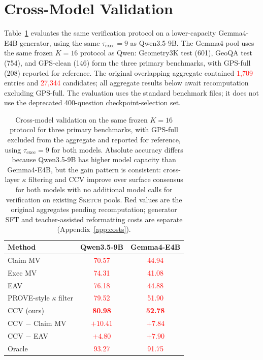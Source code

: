 \documentclass{article}
\newcommand{\sketch}{\textsc{Sketch}}
\newcommand{\ccv}{\textsc{CCV}}
\newcommand{\recheck}[1]{\textcolor{red}{#1}}
\begin{document}
\section{Cross-Model Validation}
\label{app:cross-model}

Table~\ref{tab:cross-model} evaluates the same verification protocol on a lower-capacity Gemma4-E4B generator, using the same $\tau_{\text{exec}}{=}9$ as Qwen3.5-9B. The Gemma4 pool uses the same frozen $K{=}16$ protocol as Qwen: Geometry3K test (601), GeoQA test (754), and GPS-clean (146) form the three primary benchmarks, with GPS-full (208) reported for reference. The original overlapping aggregate contained \recheck{1,709} entries and \recheck{27,344} candidates; all aggregate results below await recomputation excluding GPS-full. The evaluation uses the standard benchmark files; it does not use the deprecated 400-question checkpoint-selection set.

\begin{table}[h]
\centering
\caption{Cross-model validation on the same frozen $K{=}16$ protocol for three primary benchmarks, with GPS-full excluded from the aggregate and reported for reference, using $\tau_{\text{exec}}{=}9$ for both models. Absolute accuracy differs because Qwen3.5-9B has higher model capacity than Gemma4-E4B, but the gain pattern is consistent: cross-layer $\kappa$ filtering and \ccv{} improve over surface consensus for both models with no additional model calls for verification on existing \sketch{} pools. Red values are the original aggregates pending recomputation; generator SFT and teacher-assisted reformatting costs are separate (Appendix~\ref{app:costs}).}
\label{tab:cross-model}
\small
\begin{tabular}{lcc}
\toprule
Method & Qwen3.5-9B & Gemma4-E4B \\
\midrule
Claim MV & \recheck{70.57} & \recheck{44.94} \\
Exec MV & \recheck{74.31} & \recheck{41.08} \\
EAV & \recheck{76.18} & \recheck{44.88} \\
PROVE-style $\kappa$ filter & \recheck{79.52} & \recheck{51.90} \\
\ccv{} (ours) & \recheck{\textbf{80.98}} & \recheck{\textbf{52.78}} \\
\midrule
\ccv{} $-$ Claim MV & \recheck{$+10.41$} & \recheck{$+7.84$} \\
\ccv{} $-$ EAV & \recheck{$+4.80$} & \recheck{$+7.90$} \\
Oracle & \recheck{93.27} & \recheck{91.75} \\
\bottomrule
\end{tabular}
\end{table}
\end{document}
